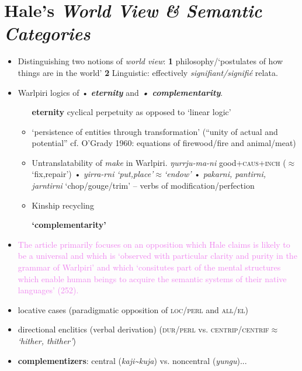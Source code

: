 \documentclass[10pt]{article}
\begin{document}
	\section{Hale's  \textit{World View \& Semantic Categories}}
	\begin{itemize}
		\item Distinguishing two notions of \textit{world view}: \textbf{1} philosophy/`postulates of how things are in the world' \textbf{2} Linguistic: effectively \textit{signifiant/signifié} relata.
		\item Warlpiri logics of • \textbf{\textit{eternity}} and \textbf{\textit{• complementarity}}.
		\begin{itemize}
			\item[\textbf{eternity}] cyclical perpetuity as opposed to `linear logic' 
			\item `persistence of entities through transformation' (``unity of actual and potential'' cf. O'Grady 1960: equations of firewood/fire and animal/meat)
			\item Untranslatability of \textit{make} in Warlpiri. \textit{ŋurrju-ma-ni} good+\textsc{caus+inch} ($\approx$`fix,repair') • \textit{yirra-rni} \textit{`put,place'$\approx$`endow'} • \textit{pakarni, pantirni, jarntirni} `chop/gouge/trim' -- verbs of modification/perfection
			\item Kinship recycling
				\item[\textbf{`complementarity'}] 
		\end{itemize}
	\item \textcolor{violet}{The article primarily focuses on an opposition which Hale claims is likely to be a universal and which is `observed with particular clarity and purity in the grammar of Warlpiri' and which `consitutes part of the mental structures which enable human beings to acquire the semantic systems of their native languages' (252).}
	\item locative cases (paradigmatic opposition of \textsc{loc/perl} and \textsc{all/el})
	\item directional enclitics (verbal derivation) (\textsc{dur/perl} vs. \textsc{centrip/centrif}$\approx$\textit{`hither, thither'})
	\item \textbf{complementizers}: central (\textit{kaji\textasciitilde kuja}) vs. noncentral (\textit{yungu})...
	

\end{itemize}
\end{document}
